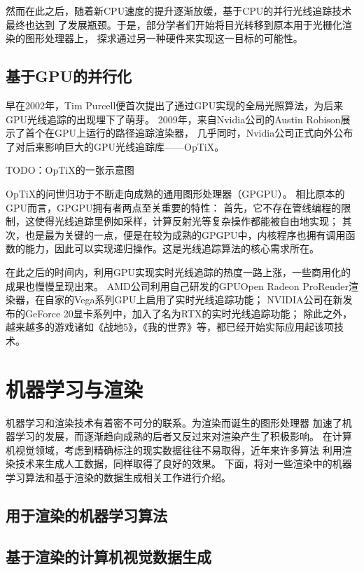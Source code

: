 然而在此之后，随着新CPU速度的提升逐渐放缓，基于CPU的并行光线追踪技术最终也达到
了发展瓶颈。于是，部分学者们开始将目光转移到原本用于光栅化渲染的图形处理器上，
探求通过另一种硬件来实现这一目标的可能性。

\subsection{基于GPU的并行化} 

早在2002年，Tim Purcell便首次提出了通过GPU实现的全局光照算法，为后来GPU光线追踪的出现埋下了萌芽。
2009年，来自Nvidia公司的Austin Robison展示了首个在GPU上运行的路径追踪渲染器，
几乎同时，Nvidia公司正式向外公布了对后来影响巨大的GPU光线追踪库——OpTiX\cite{Optix}。

TODO：OpTiX的一张示意图

OpTiX的问世归功于不断走向成熟的通用图形处理器（GPGPU）。
相比原本的GPU而言，GPGPU拥有者两点至关重要的特性：
首先，它不存在管线编程的限制，这使得光线追踪里例如采样，计算反射光等复杂操作都能被自由地实现；
其次，也是最为关键的一点，便是在较为成熟的GPGPU中，内核程序也拥有调用函数的能力，因此可以实现递归操作。这是光线追踪算法的核心需求所在。

在此之后的时间内，利用GPU实现实时光线追踪的热度一路上涨，一些商用化的成果也慢慢呈现出来。
AMD公司利用自己研发的GPUOpen Radeon ProRender渲染器，在自家的Vega系列GPU上启用了实时光线追踪功能\cite{Vega}；
NVIDIA公司在新发布的GeForce 20显卡系列中，加入了名为RTX的实时光线追踪功能\cite{RTXOn}；
除此之外，越来越多的游戏诸如《战地5》，《我的世界》等，都已经开始实际应用起该项技术。

\section{机器学习与渲染}

机器学习和渲染技术有着密不可分的联系。为渲染而诞生的图形处理器
加速了机器学习的发展，而逐渐趋向成熟的后者又反过来对渲染产生了积极影响。
在计算机视觉领域，考虑到精确标注的现实数据往往不易取得，近年来许多算法
利用渲染技术来生成人工数据，同样取得了良好的效果。
下面，将对一些渲染中的机器学习算法和基于渲染的数据生成相关工作进行介绍。

\subsection{用于渲染的机器学习算法}



\subsection{基于渲染的计算机视觉数据生成}
